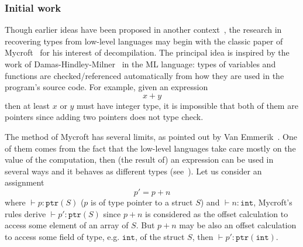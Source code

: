 \documentclass[compsoc,conference,a4paper,10pt,times]{IEEEtran}
\begin{document}
\subsubsection*{Initial work}
\noindent
Though earlier ideas have been proposed in another context~\cite{shivers_data-flow_1990},
the research in recovering types from low-level languages may begin with the classic paper of
Mycroft~\cite{mycroft_type-based_1999} for his interest of decompilation. The principal idea is
inspired by the work of Damas-Hindley-Milner~\cite{milner_theory_1978,hindley_principal_1969,damas_principal_1982} in
the ML language: types of variables and functions are checked/referenced automatically
from how they are used in the program's source code. For example, given an expression
\begin{equation*}
  x + y
\end{equation*}
then at least $x$ or $y$ must have integer type, it is impossible that both of them are pointers
since adding two pointers does not type check.

The method of Mycroft has several limits, as pointed out by Van Emmerik~\cite{van_emmerik_static_2007}.
One of them comes from the fact that the low-level languages take care mostly on the value of
the computation, then (the result of) an expression can be used in several ways and it behaves as
different types (see~). Let us consider an assignment
\begin{equation*}
  p' = p + n
\end{equation*}
where $\vdash p \colon \mathtt{ptr}(S)$ ($p$ is of type pointer to a struct $S$) and
$\vdash n \colon \mathtt{int}$, Mycroft's
rules derive $\vdash p' \colon \mathtt{ptr}(S)$ since $p + n$ is considered as the offset calculation to
access some element of an array of $S$. But $p + n$ may be also an
offset calculation to access some field of type, e.g. $\mathtt{int}$, of the struct $S$,
then $\vdash p' \colon \mathtt{ptr}(\mathtt{int})$.
\end{document}
